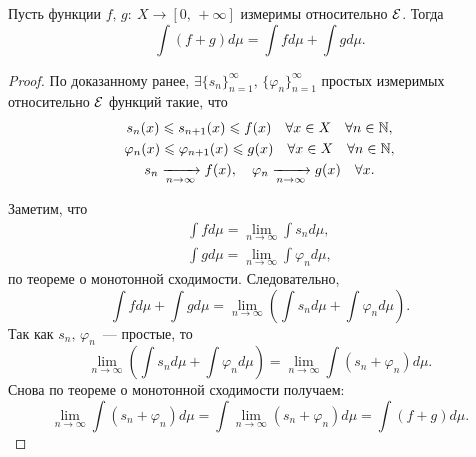 \begin{claim}
    Пусть функции $f,\, g:\: X\to[0,\, +\infty]$ измеримы относительно $\mathcal{E}$. Тогда \[
        \int(f+g)d\mu=\int fd\mu+\int gd\mu.
    \]

    \begin{proof}

        По доказанному ранее, $\exists\{s_n\}_{n=1}^{\infty},\, \{\varphi_n\}_{n=1}^{\infty}$ простых измеримых относительно $\mathcal{E}$ функций
        такие, что \begin{gather*}
            s_n(x)\leqslant s_{n+1}(x)\leqslant f(x)\quad \forall x\in X\quad \forall n\in\mathbb{N},\\
            \varphi_n(x)\leqslant \varphi_{n+1}(x)\leqslant g(x)\quad \forall x\in X\quad \forall n\in\mathbb{N},\\
            s_n\xrightarrow[n\to\infty]{}f(x),\quad
            \varphi_n\xrightarrow[n\to\infty]{}g(x)\quad \forall x.
        \end{gather*}

        Заметим, что \begin{gather*}
            \int fd\mu=\lim_{n\to\infty}\int s_nd\mu,\\
            \int gd\mu=\lim_{n\to\infty}\int \varphi_nd\mu,
        \end{gather*}
        по теореме о монотонной сходимости.
        Следовательно, \[
            \int fd\mu+\int gd\mu=\lim_{n\to\infty}\left(\int s_nd\mu+\int \varphi_nd\mu\right).
        \]
        Так как $s_n,\, \varphi_n$~--- простые, то \[
            \lim_{n\to\infty}\left(\int s_nd\mu+\int \varphi_nd\mu\right)=
            \lim_{n\to\infty}\int \left(s_n+\varphi_n\right)d\mu.
        \]
        Снова по теореме о монотонной сходимости получаем: \[
            \lim_{n\to\infty}\int \left(s_n+\varphi_n\right)d\mu=
            \int\lim_{n\to\infty}(s_n+\varphi_n)d\mu=
            \int(f+g)d\mu.
        \]

    \end{proof}
\end{claim}